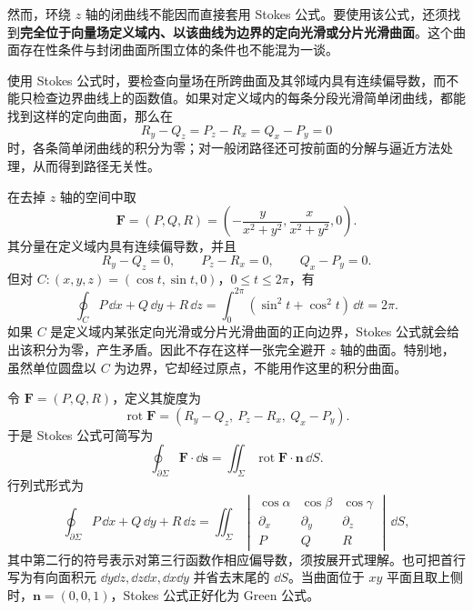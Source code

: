 \begin{remark}[闭曲线与封闭曲面对应的两种条件]
\begin{remark}
然而，环绕 $z$ 轴的闭曲线不能因而直接套用 Stokes 公式。要使用该公式，还须找到\textbf{完全位于向量场定义域内、以该曲线为边界的定向光滑或分片光滑曲面}。这个曲面存在性条件与封闭曲面所围立体的条件也不能混为一谈。
\end{remark}

使用 Stokes 公式时，要检查向量场在所跨曲面及其邻域内具有连续偏导数，而不能只检查边界曲线上的函数值。如果对定义域内的每条分段光滑简单闭曲线，都能找到这样的定向曲面，那么在
\[
R_y-Q_z=P_z-R_x=Q_x-P_y=0
\]
时，各条简单闭曲线的积分为零；对一般闭路径还可按前面的分解与逼近方法处理，从而得到路径无关性。
\end{remark}

\begin{example}
在去掉 $z$ 轴的空间中取
\[
\boldsymbol F=(P,Q,R)
=\left(-\frac{y}{x^2+y^2},\frac{x}{x^2+y^2},0\right).
\]
其分量在定义域内具有连续偏导数，并且
\[
R_y-Q_z=0,\qquad P_z-R_x=0,\qquad Q_x-P_y=0.
\]
但对 $C:(x,y,z)=(\cos t,\sin t,0)$，$0\le t\le2\pi$，有
\[
\oint_C P\,\dd x+Q\,\dd y+R\,\dd z
=\int_0^{2\pi}(\sin^2t+\cos^2t)\,\dd t=2\pi.
\]
如果 $C$ 是定义域内某张定向光滑或分片光滑曲面的正向边界，Stokes 公式就会给出该积分为零，产生矛盾。因此不存在这样一张完全避开 $z$ 轴的曲面。特别地，虽然单位圆盘以 $C$ 为边界，它却经过原点，不能用作这里的积分曲面。
\end{example}

令 $\boldsymbol F=(P,Q,R)$，定义其旋度为
\[
\operatorname{rot}\boldsymbol F
=(R_y-Q_z,\ P_z-R_x,\ Q_x-P_y).
\]
于是 Stokes 公式可简写为
\[
\oint_{\partial\Sigma}\boldsymbol F\cdot\dd\boldsymbol s
=\displaystyle\iint_\Sigma\operatorname{rot}\boldsymbol F\cdot\boldsymbol n\,\dd S.
\]
行列式形式为
\[
\oint_{\partial\Sigma}P\,\dd x+Q\,\dd y+R\,\dd z
=\displaystyle\iint_\Sigma
\begin{vmatrix}
\cos\alpha&\cos\beta&\cos\gamma\\
\partial_x&\partial_y&\partial_z\\
P&Q&R
\end{vmatrix}\,\dd S,
\]
其中第二行的符号表示对第三行函数作相应偏导数，须按展开式理解。也可把首行写为有向面积元 $\dd y\dd z,\dd z\dd x,\dd x\dd y$ 并省去末尾的 $\dd S$。当曲面位于 $xy$ 平面且取上侧时，$\boldsymbol n=(0,0,1)$，Stokes 公式正好化为 Green 公式。
